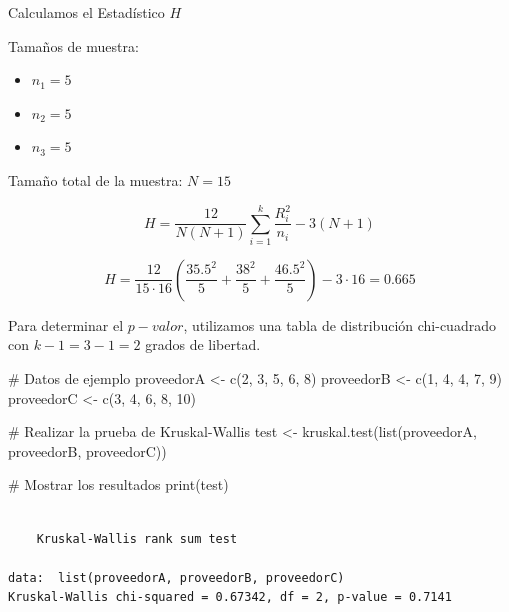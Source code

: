 \documentclass[
  letterpaper,
  DIV=11,
  numbers=noendperiod]{scrreprt}
\newenvironment{Shaded}{\begin{snugshade}}{\end{snugshade}}
\newcommand{\CommentTok}[1]{\textcolor[rgb]{0.37,0.37,0.37}{#1}}
\newcommand{\DecValTok}[1]{\textcolor[rgb]{0.68,0.00,0.00}{#1}}
\newcommand{\FunctionTok}[1]{\textcolor[rgb]{0.28,0.35,0.67}{#1}}
\newcommand{\NormalTok}[1]{\textcolor[rgb]{0.00,0.23,0.31}{#1}}
\newcommand{\OtherTok}[1]{\textcolor[rgb]{0.00,0.23,0.31}{#1}}
\providecommand{\tightlist}{%
  \setlength{\itemsep}{0pt}\setlength{\parskip}{0pt}}\usepackage{longtable,booktabs,array}
\begin{document}
\begin{tcolorbox}
Calculamos el Estadístico \(H\)

Tamaños de muestra:

\begin{itemize}
\tightlist
\item
  \(n_1 = 5\)
\item
  \(n_2 = 5\)
\item
  \(n_3 = 5\)
\end{itemize}

Tamaño total de la muestra: \(N = 15\)

\[
H = \frac{12}{N(N+1)} \sum_{i=1}^{k} \frac{R_i^2}{n_i} - 3(N+1)
\]

\[
H = \frac{12}{15 \cdot 16} \left( \frac{35.5^2}{5} + \frac{38^2}{5} + \frac{46.5^2}{5} \right) - 3 \cdot 16 = 0.665
\]

Para determinar el \(p-valor\), utilizamos una tabla de distribución
chi-cuadrado con \(k-1 = 3-1 = 2\) grados de libertad.

\begin{Shaded}
\begin{Highlighting}[]
\CommentTok{\# Datos de ejemplo}
\NormalTok{proveedorA }\OtherTok{\textless{}{-}} \FunctionTok{c}\NormalTok{(}\DecValTok{2}\NormalTok{, }\DecValTok{3}\NormalTok{, }\DecValTok{5}\NormalTok{, }\DecValTok{6}\NormalTok{, }\DecValTok{8}\NormalTok{)}
\NormalTok{proveedorB }\OtherTok{\textless{}{-}} \FunctionTok{c}\NormalTok{(}\DecValTok{1}\NormalTok{, }\DecValTok{4}\NormalTok{, }\DecValTok{4}\NormalTok{, }\DecValTok{7}\NormalTok{, }\DecValTok{9}\NormalTok{)}
\NormalTok{proveedorC }\OtherTok{\textless{}{-}} \FunctionTok{c}\NormalTok{(}\DecValTok{3}\NormalTok{, }\DecValTok{4}\NormalTok{, }\DecValTok{6}\NormalTok{, }\DecValTok{8}\NormalTok{, }\DecValTok{10}\NormalTok{)}

\CommentTok{\# Realizar la prueba de Kruskal{-}Wallis}
\NormalTok{test }\OtherTok{\textless{}{-}} \FunctionTok{kruskal.test}\NormalTok{(}\FunctionTok{list}\NormalTok{(proveedorA, proveedorB, proveedorC))}

\CommentTok{\# Mostrar los resultados}
\FunctionTok{print}\NormalTok{(test)}
\end{Highlighting}
\end{Shaded}

\begin{verbatim}

    Kruskal-Wallis rank sum test

data:  list(proveedorA, proveedorB, proveedorC)
Kruskal-Wallis chi-squared = 0.67342, df = 2, p-value = 0.7141
\end{verbatim}


\end{tcolorbox}
\end{document}
